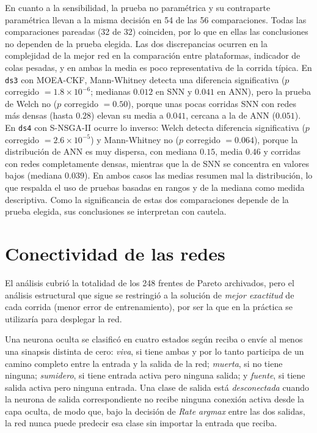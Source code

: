 En cuanto a la sensibilidad, la prueba no paramétrica y su contraparte paramétrica llevan a la misma decisión en 54 de las 56 comparaciones. Todas las comparaciones pareadas (32 de 32) coinciden, por lo que en ellas las conclusiones no dependen de la prueba elegida. Las dos discrepancias ocurren en la complejidad de la mejor red en la comparación entre plataformas, indicador de colas pesadas, y en ambas la media es poco representativa de la corrida típica. En \texttt{ds3} con MOEA-CKF, Mann-Whitney detecta una diferencia significativa ($p$ corregido $=1.8\times10^{-6}$; medianas $0.012$ en SNN y $0.041$ en ANN), pero la prueba de Welch no ($p$ corregido $=0.50$), porque unas pocas corridas SNN con redes más densas (hasta $0.28$) elevan su media a $0.041$, cercana a la de ANN ($0.051$). En \texttt{ds4} con S-NSGA-II ocurre lo inverso: Welch detecta diferencia significativa ($p$ corregido $=2.6\times10^{-5}$) y Mann-Whitney no ($p$ corregido $=0.064$), porque la distribución de ANN es muy dispersa, con mediana $0.15$, media $0.46$ y corridas con redes completamente densas, mientras que la de SNN se concentra en valores bajos (mediana $0.039$). En ambos casos las medias resumen mal la distribución, lo que respalda el uso de pruebas basadas en rangos y de la mediana como medida descriptiva. Como la significancia de estas dos comparaciones depende de la prueba elegida, sus conclusiones se interpretan con cautela.



\section{Conectividad de las redes}
\label{sec:conectividad}

El análisis cubrió la totalidad de los 248 frentes de Pareto archivados, pero el análisis estructural que sigue se restringió a la solución de \emph{mejor exactitud} de cada corrida (menor error de entrenamiento), por ser la que en la práctica se utilizaría para desplegar la red. 


Una neurona oculta se clasificó en cuatro estados según reciba o envíe al menos una sinapsis distinta de cero: \emph{viva}, si tiene ambas y por lo tanto participa de un camino completo entre la entrada y la salida de la red; \emph{muerta}, si no tiene ninguna; \emph{sumidero}, si tiene entrada activa pero ninguna salida; y \emph{fuente}, si tiene salida activa pero ninguna entrada. Una clase de salida está \emph{desconectada} cuando la neurona de salida correspondiente no recibe ninguna conexión activa desde la capa oculta, de modo que, bajo la decisión de \textit{Rate argmax} entre las dos salidas, la red nunca puede predecir esa clase sin importar la entrada que reciba.


